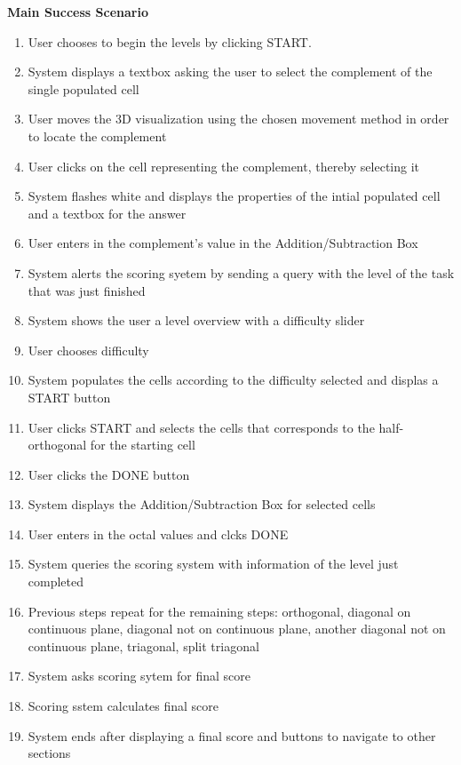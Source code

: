 \documentclass[12pt]{article}
\begin{document}
\textbf{Main Success Scenario}
\begin{enumerate}
\item User chooses to begin the levels by clicking START.
\item System displays a textbox asking the user to select the complement of the single populated cell
\item User moves the 3D visualization using the chosen movement method in order to locate the complement
\item User clicks on the cell representing the complement, thereby selecting it
\item System flashes white and displays the properties of the intial populated cell and a textbox for the answer
\item User enters in the complement's value in the Addition/Subtraction Box
\item System alerts the scoring syetem by sending a query with the level of the task that was just finished
\item System shows the user a level overview with a difficulty slider
\item User chooses difficulty
\item System populates the cells according to the difficulty selected and displas a START button
\item User clicks START and selects the cells that corresponds to the half-orthogonal for the starting cell
\item User clicks the DONE button
\item System displays the Addition/Subtraction Box for selected cells
\item User enters in the octal values and clcks DONE
\item System queries the scoring system with information of the level just completed
\item Previous steps repeat for the remaining steps: orthogonal, diagonal on continuous plane, diagonal not on continuous plane, another diagonal not on continuous plane, triagonal, split triagonal 
\item System asks scoring sytem for final score
\item Scoring sstem calculates final score
\item System ends after displaying a final score and buttons to navigate to other sections
\end{enumerate}
\end{document}

